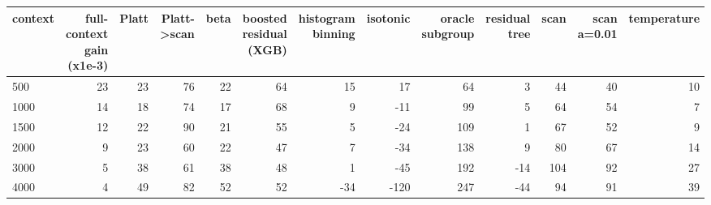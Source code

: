 \begin{tabular}{lrrrrrrrrrrrr}
\toprule
context & full-context gain (x1e-3) & Platt & Platt->scan & beta & boosted residual (XGB) & histogram binning & isotonic & oracle subgroup & residual tree & scan & scan a=0.01 & temperature \\
\midrule
500 & 23 & 23 & 76 & 22 & 64 & 15 & 17 & 64 & 3 & 44 & 40 & 10 \\
1000 & 14 & 18 & 74 & 17 & 68 & 9 & -11 & 99 & 5 & 64 & 54 & 7 \\
1500 & 12 & 22 & 90 & 21 & 55 & 5 & -24 & 109 & 1 & 67 & 52 & 9 \\
2000 & 9 & 23 & 60 & 22 & 47 & 7 & -34 & 138 & 9 & 80 & 67 & 14 \\
3000 & 5 & 38 & 61 & 38 & 48 & 1 & -45 & 192 & -14 & 104 & 92 & 27 \\
4000 & 4 & 49 & 82 & 52 & 52 & -34 & -120 & 247 & -44 & 94 & 91 & 39 \\
\bottomrule
\end{tabular}
